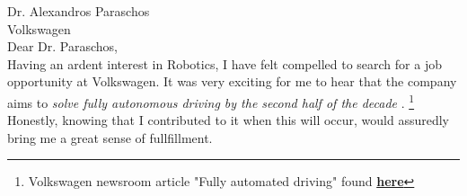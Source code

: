 Dr. Alexandros Paraschos\\
\vspace{0.6cm}
Volkswagen\\
\vspace{0.6cm}
Dear Dr. Paraschos,\\
\vspace{0.4cm}
Having an ardent interest in Robotics, I have felt compelled to search for a job opportunity at Volkswagen.
  It was very exciting for me to hear that the company aims to
  \textit{solve fully autonomous driving by the second half of the decade }.
  \footnote{Volkswagen newsroom article "Fully automated driving" found
  \href{ https://www.volkswagen-newsroom.com/en/fully-automated-driving-3633}{\textbf{here}}}\\\smallskip
Honestly, knowing that I contributed to it when this will occur,
 would assuredly bring me a great sense of fullfillment.\\\smallskip


